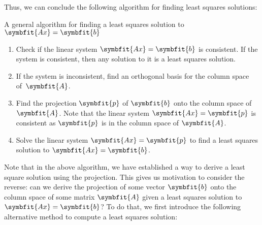 \documentclass[math]{amznotes}
\theoremstyle{remark}
\begin{document}
Thus, we can conclude the following algorithm for finding least squares solutions:
\begin{genbox}{A general algorithm for finding a least squares solution to $\symbfit{Ax} = \symbfit{b}$}{}
    \begin{enumerate}
        \item Check if the linear system $\symbfit{Ax} = \symbfit{b}$ is consistent. If the system is consistent, then any solution to it is a least squares solution.
        \item If the system is inconsistent, find an orthogonal basis for the column space of~$\symbfit{A}$.
        \item Find the projection $\symbfit{p}$ of $\symbfit{b}$ onto the column space of $\symbfit{A}$. Note that the linear system $\symbfit{Ax} = \symbfit{p}$ is consistent as $\symbfit{p}$ is in the column space of $\symbfit{A}$.
        \item Solve the linear system $\symbfit{Ax} = \symbfit{p}$ to find a least squares solution to $\symbfit{Ax} = \symbfit{b}$.
    \end{enumerate}
\end{genbox}
Note that in the above algorithm, we have established a way to derive a least square solution using the projection. This gives us motivation to consider the reverse: can we derive the projection of some vector $\symbfit{b}$ onto the column space of some matrix $\symbfit{A}$ given a least squares solution to $\symbfit{Ax} = \symbfit{b}$? To do that, we first introduce the following alternative method to compute a least squares solution:
\end{document}

